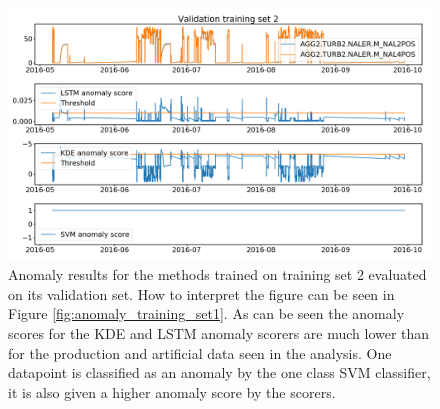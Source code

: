     \begin{figure}
        \centering
        \includegraphics[width=\textwidth]{report/figures/analysis/plant2_train_short/test_data_anomaly.png}
        \caption{Anomaly results for the methods trained on training set 2 evaluated on its validation set. How to interpret the figure can be seen in Figure \ref{fig:anomaly_training_set1}. As can be seen the anomaly scores for the KDE and LSTM anomaly scorers are much lower than for the production and artificial data seen in the analysis. One datapoint is classified as an anomaly by the one class SVM classifier, it is also given a higher anomaly score by the scorers.}
    \end{figure}


    
